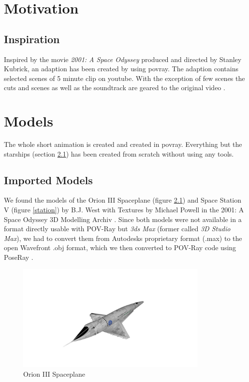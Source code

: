
\chapter{Motivation}
\section{Inspiration}
Inspired by the movie \textit{2001: A Space Odyssey} produced and directed by Stanley Kubrick, an adaption has been created by using povray. The adaption contains selected scenes of 5 minute clip on youtube.  With the exception of few scenes the cuts and scenes as well as the soundtrack are geared to the original video  \cite{EbClectic}.

\chapter{Models}

The whole short animation is created and created in povray. Everything but the starships (section \ref{imported_models}) has been created from scratch without using any tools.

\section{Imported Models} \label{imported_models}

We found the models of the Orion III Spaceplane (figure \ref{orion}) and Space Station V (figure \ref{station}) by B.J. West with Textures by Michael Powell in the 2001: A Space Odyssey 3D Modelling Archiv \cite{Archive}.
Since both models were not available in a format directly usable with POV-Ray but \textit{3ds Max} (former called \textit{3D Studio Max}), we had to convert them from Autodesks proprietary format (.max) to the open Wavefront .obj format, which we then converted to POV-Ray code using PoseRay \cite{PoseRay}.

\begin{figure}[ht]
	\centering
	\includegraphics[width=0.85\textwidth]{images/orion.jpg}
	\caption{Orion III Spaceplane}
	\label{orion}
\end{figure}

